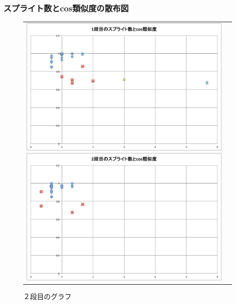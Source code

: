 \documentclass[twocolumn,9pt,a4paper]{jsarticle}
\begin{document}
\subsubsection{スプライト数とcos類似度の散布図}
\begin{figure}[ht]
 \begin{tabular}{cc}
 	\begin{minipage}[t]{0.45\hsize}
	 \centering
	 \includegraphics[keepaspectratio, scale = 0.14]{mazegame_first_splite.pdf}
	 \caption{１段目のグラフ}
	 \label{first_splite}
	\end{minipage}
        \begin{minipage}[t]{0.45\hsize}
	 \centering
	 \includegraphics[keepaspectratio, scale = 0.14]{mazegame_second_splite.pdf}
	 \caption{２段目のグラフ}
	 \label{second_splite}
	\end{minipage}
 \end{tabular}
 \end{figure}
\end{document}
